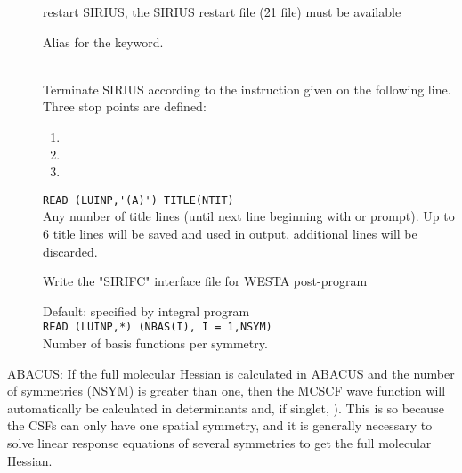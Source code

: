 \begin{description}
\item[]
  restart SIRIUS,
  the SIRIUS restart file (\f{21} file) must be available
 
\item[]
	Alias for the  keyword.

\item[]
   \\
  Terminate SIRIUS according to the instruction given on the following line.
  Three stop points are defined:
\begin{enumerate}
 
\item \hspace{2em} 
 
\item \hspace{2em} 
 
\item \hspace{2em} 
\end{enumerate}
 
\item[]
  \verb"READ (LUINP,'(A)') TITLE(NTIT)" \\
  Any number of title lines (until next line beginning with
   or \quotekw{*} prompt).
  Up to 6 title lines will be saved and used in output, additional
  lines will be discarded.
 
\item[]
  Write the "SIRIFC" interface file for WESTA post-program
  
\item[]
   Default: specified by integral program \\
   \verb"READ (LUINP,*) (NBAS(I), I = 1,NSYM)" \\
   Number of basis functions per symmetry.
\end{description}
 

\ifabacus
ABACUS: If the full molecular Hessian is calculated in ABACUS and the
number of symmetries (NSYM) is greater than one, then the MCSCF wave function
will automatically be calculated in determinants
and, if singlet,  
).  This is so because the CSFs can only
have one spatial symmetry, and it is generally necessary to solve linear
response equations of several symmetries to get the full molecular Hessian.
\fi

